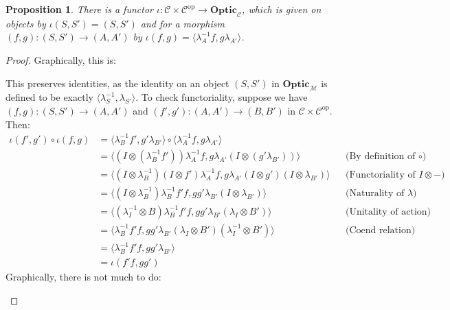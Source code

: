 \documentclass[11pt,a4paper]{article}
\theoremstyle{plain}
\newtheorem{proposition}[theorem]{Proposition}
\theoremstyle{definition}
\newcommand{\C}{\mathscr{C}}
\newcommand{\M}{\mathscr{M}}
\newcommand{\Optic}{\mathbf{Optic}}
\newcommand{\op}{\mathrm{op}}
\begin{document}
\begin{proposition}
  There is a functor $\iota : \C \times \C^\op \to \Optic_\C$, which is given on objects by $\iota(S, S') = (S, S')$ and for a morphism $(f, g) : (S, S') \to (A, A')$ by $\iota(f, g) = \langle \lambda_A^{-1} f, g \lambda_{A'} \rangle$.
\end{proposition}
\begin{proof}
  Graphically, this is:
  \begin{center}
    
  \end{center}

  This preserves identities, as the identity on an object $(S, S')$ in $\Optic_\M$ is defined to be exactly $\langle \lambda^{-1}_S, \lambda_{S'} \rangle$. To check functoriality, suppose we have $(f, g) : (S, S') \to (A, A')$ and $(f', g') : (A, A') \to (B, B')$ in $\C \times \C^\op$. Then:
  \begin{align*}
    \iota(f', g') \circ \iota(f, g)
    &= \langle \lambda^{-1}_B f', g' \lambda_{B'} \rangle \circ \langle \lambda^{-1}_A f, g \lambda_{A'} \rangle \\
    &= \langle (I\otimes (\lambda^{-1}_B f'))\lambda^{-1}_A f, g \lambda_{A'} (I\otimes (g' \lambda_{B'}))\rangle && \text{(By definition of $\circ$)}\\
    &= \langle (I \otimes \lambda^{-1}_B) (I \otimes f')\lambda^{-1}_A f, g \lambda_{A'} (I \otimes g')(I\otimes \lambda_{B'})\rangle && \text{(Functoriality of $I \otimes -$)}\\
    &= \langle (I\otimes \lambda^{-1}_B) \lambda^{-1}_B f' f, g g' \lambda_{B'} (I\otimes \lambda_{B'})\rangle && \text{(Naturality of $\lambda$)}\\
    &= \langle (\lambda^{-1}_I \otimes B) \lambda^{-1}_B f' f, g g' \lambda_{B'} (\lambda_I \otimes B')\rangle && \text{(Unitality of action)} \\
    &= \langle \lambda^{-1}_B f' f, g g' \lambda_{B'} (\lambda_I \otimes B') (\lambda^{-1}_I \otimes B') \rangle && \text{(Coend relation)}  \\
    &= \langle \lambda^{-1}_B f'f, g g' \lambda_{B'} \rangle \\
    &= \iota(f'f, gg')
  \end{align*}
  Graphically, there is not much to do:
  \begin{center}
    
    \qquad \raisebox{0.3cm}{$=$} \qquad
    
  \end{center}

\end{proof}
\end{document}
